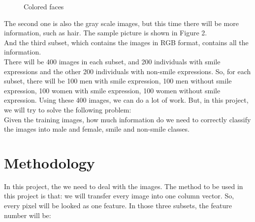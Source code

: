 \documentclass[11pt]{article}
\begin{document}
\begin{figure}[H]
\centering
{}
\caption{Colored faces}
\label{Fig.lable}
\end{figure}

The second one is also the gray scale images, but this time there will be more information, such as hair. The sample picture is shown in Figure 2.\\

And the third subset, which contains the images in RGB format, contains all the information.\\

There will be 400 images in each subset, and 200 individuals with smile expressions and the other 200 individuals with non-smile expressions. So, for each subset, there will be 100 men with smile expression, 100 men without smile expression, 100 women with smile expression, 100 women without smile expression. Using these 400 images, we can do a lot of work. But, in this project, we will try to solve the following problem:\\

Given the training images, how much information do we need to correctly classify the images into male and female, smile and non-smile classes.\\

\section{Methodology}

In this project, the we need to deal with the images. The method to be used in this project is that: we will transfer every image into one column vector. So, every pixel will be looked as one feature. In those three subsets, the feature number will be:
\end{document}
